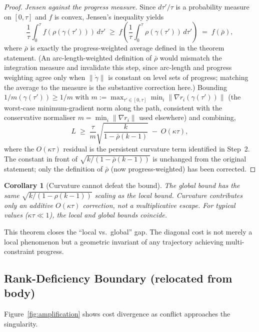 \documentclass{article}
\theoremstyle{plain}
\newtheorem{corollary}[theorem]{Corollary}
\theoremstyle{definition}
\theoremstyle{remark}
\begin{document}
\begin{proof}
\emph{Jensen against the progress measure.} Since $d\tau'/\tau$ is a probability measure on $[0,\tau]$ and $f$ is convex, Jensen's inequality yields
\[
\frac{1}{\tau}\int_0^\tau f(\rho(\gamma(\tau')))\, d\tau' \;\ge\; f\!\left(\frac{1}{\tau}\int_0^\tau \rho(\gamma(\tau'))\, d\tau'\right) \;=\; f(\bar\rho),
\]
where $\bar\rho$ is exactly the progress-weighted average defined in the theorem statement. (An arc-length-weighted definition of $\bar\rho$ would mismatch the integration measure and invalidate this step, since arc-length and progress weighting agree only when $\|\dot\gamma\|$ is constant on level sets of progress; matching the average to the measure is the substantive correction here.) Bounding $1/m(\gamma(\tau')) \ge 1/m$ with $m := \max_{\tau'\in[0,\tau]} \min_i\|\nabla r_i(\gamma(\tau'))\|$ (the worst-case minimum-gradient norm along the path, consistent with the conservative normaliser $m = \min_i\|\nabla r_i\|$ used elsewhere) and combining,
\[
L \;\ge\; \frac{\tau}{m}\sqrt{\frac{k}{1-\bar{\rho}(k-1)}} \;-\; O(\kappa\tau),
\]
where the $O(\kappa\tau)$ residual is the persistent curvature term identified in Step~2. The constant in front of $\sqrt{k/(1-\bar\rho(k-1))}$ is unchanged from the original statement; only the definition of $\bar\rho$ (now progress-weighted) has been corrected.
\end{proof}

\begin{corollary}[Curvature cannot defeat the bound]
The global bound has the same $\sqrt{k/(1-\rho(k-1))}$ scaling as the local bound. Curvature contributes only an additive $O(\kappa\tau)$ correction, not a multiplicative escape. For typical values ($\kappa\tau \ll 1$), the local and global bounds coincide.
\end{corollary}

This theorem closes the ``local vs.\ global'' gap. The diagonal cost is not merely a local phenomenon but a geometric invariant of any trajectory achieving multi-constraint progress.

\subsection{Rank-Deficiency Boundary (relocated from body)}\label{app:rank_deficiency_boundary}

Figure~\ref{fig:amplification} shows cost divergence as conflict approaches the singularity.
\end{document}
